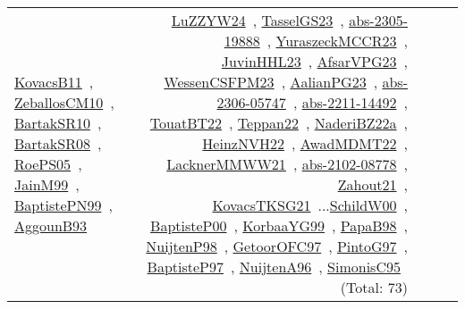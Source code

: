 {\begin{longtable}{p{3cm}r>{\raggedright\arraybackslash}p{6cm}>{\raggedright\arraybackslash}p{6cm}>{\raggedright\arraybackslash}p{8cm}}
\href{../works/KovacsB11.pdf}{KovacsB11}~\cite{KovacsB11}, \href{../works/ZeballosCM10.pdf}{ZeballosCM10}~\cite{ZeballosCM10}, \href{../works/BartakSR10.pdf}{BartakSR10}~\cite{BartakSR10}, \href{../works/BartakSR08.pdf}{BartakSR08}~\cite{BartakSR08}, \href{../works/RoePS05.pdf}{RoePS05}~\cite{RoePS05}, \href{../works/JainM99.pdf}{JainM99}~\cite{JainM99}, \href{../works/BaptistePN99.pdf}{BaptistePN99}~\cite{BaptistePN99}, \href{../works/AggounB93.pdf}{AggounB93}~\cite{AggounB93} & \href{../works/LuZZYW24.pdf}{LuZZYW24}~\cite{LuZZYW24}, \href{../works/TasselGS23.pdf}{TasselGS23}~\cite{TasselGS23}, \href{../works/abs-2305-19888.pdf}{abs-2305-19888}~\cite{abs-2305-19888}, \href{../works/YuraszeckMCCR23.pdf}{YuraszeckMCCR23}~\cite{YuraszeckMCCR23}, \href{../works/JuvinHHL23.pdf}{JuvinHHL23}~\cite{JuvinHHL23}, \href{../works/AfsarVPG23.pdf}{AfsarVPG23}~\cite{AfsarVPG23}, \href{../works/WessenCSFPM23.pdf}{WessenCSFPM23}~\cite{WessenCSFPM23}, \href{../works/AalianPG23.pdf}{AalianPG23}~\cite{AalianPG23}, \href{../works/abs-2306-05747.pdf}{abs-2306-05747}~\cite{abs-2306-05747}, \href{../works/abs-2211-14492.pdf}{abs-2211-14492}~\cite{abs-2211-14492}, \href{../works/TouatBT22.pdf}{TouatBT22}~\cite{TouatBT22}, \href{../works/Teppan22.pdf}{Teppan22}~\cite{Teppan22}, \href{../works/NaderiBZ22a.pdf}{NaderiBZ22a}~\cite{NaderiBZ22a}, \href{../works/HeinzNVH22.pdf}{HeinzNVH22}~\cite{HeinzNVH22}, \href{../works/AwadMDMT22.pdf}{AwadMDMT22}~\cite{AwadMDMT22}, \href{../works/LacknerMMWW21.pdf}{LacknerMMWW21}~\cite{LacknerMMWW21}, \href{../works/abs-2102-08778.pdf}{abs-2102-08778}~\cite{abs-2102-08778}, \href{../works/Zahout21.pdf}{Zahout21}~\cite{Zahout21}, \href{../works/KovacsTKSG21.pdf}{KovacsTKSG21}~\cite{KovacsTKSG21}...\href{../works/SchildW00.pdf}{SchildW00}~\cite{SchildW00}, \href{../works/BaptisteP00.pdf}{BaptisteP00}~\cite{BaptisteP00}, \href{../works/KorbaaYG99.pdf}{KorbaaYG99}~\cite{KorbaaYG99}, \href{../works/PapaB98.pdf}{PapaB98}~\cite{PapaB98}, \href{../works/NuijtenP98.pdf}{NuijtenP98}~\cite{NuijtenP98}, \href{../works/GetoorOFC97.pdf}{GetoorOFC97}~\cite{GetoorOFC97}, \href{../works/PintoG97.pdf}{PintoG97}~\cite{PintoG97}, \href{../works/BaptisteP97.pdf}{BaptisteP97}~\cite{BaptisteP97}, \href{../works/NuijtenA96.pdf}{NuijtenA96}~\cite{NuijtenA96}, \href{../works/SimonisC95.pdf}{SimonisC95}~\cite{SimonisC95} (Total: 73)\\

\end{longtable}}
